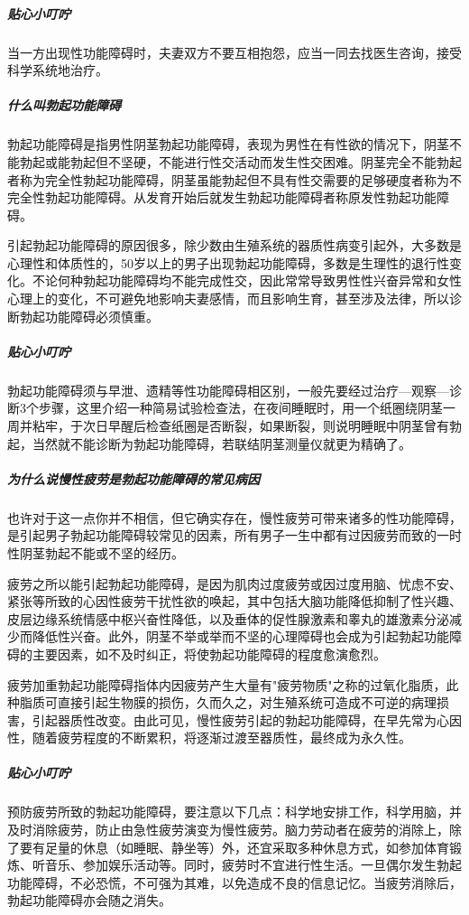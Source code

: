 \subparagraph{贴心小叮咛}

当一方出现性功能障碍时，夫妻双方不要互相抱怨，应当一同去找医生咨询，接受科学系统地治疗。

\subparagraph{什么叫勃起功能障碍}

勃起功能障碍是指男性阴茎勃起功能障碍，表现为男性在有性欲的情况下，阴茎不能勃起或能勃起但不坚硬，不能进行性交活动而发生性交困难。阴茎完全不能勃起者称为完全性勃起功能障碍，阴茎虽能勃起但不具有性交需要的足够硬度者称为不完全性勃起功能障碍。从发育开始后就发生勃起功能障碍者称原发性勃起功能障碍。

引起勃起功能障碍的原因很多，除少数由生殖系统的器质性病变引起外，大多数是心理性和体质性的，50岁以上的男子出现勃起功能障碍，多数是生理性的退行性变化。不论何种勃起功能障碍均不能完成性交，因此常常导致男性性兴奋异常和女性心理上的变化，不可避免地影响夫妻感情，而且影响生育，甚至涉及法律，所以诊断勃起功能障碍必须慎重。

\subparagraph{贴心小叮咛}

勃起功能障碍须与早泄、遗精等性功能障碍相区别，一般先要经过治疗—观察—诊断3个步骤，这里介绍一种简易试验检查法，在夜间睡眠时，用一个纸圈绕阴茎一周并粘牢，于次日早醒后检查纸圈是否断裂，如果断裂，则说明睡眠中阴茎曾有勃起，当然就不能诊断为勃起功能障碍，若联结阴茎测量仪就更为精确了。

\subparagraph{为什么说慢性疲劳是勃起功能障碍的常见病因}

也许对于这一点你并不相信，但它确实存在，慢性疲劳可带来诸多的性功能障碍，是引起男子勃起功能障碍较常见的因素，所有男子一生中都有过因疲劳而致的一时性阴茎勃起不能或不坚的经历。

疲劳之所以能引起勃起功能障碍，是因为肌肉过度疲劳或因过度用脑、忧虑不安、紧张等所致的心因性疲劳干扰性欲的唤起，其中包括大脑功能降低抑制了性兴趣、皮层边缘系统情感中枢兴奋性降低，以及垂体的促性腺激素和睾丸的雄激素分泌减少而降低性兴奋。此外，阴茎不举或举而不坚的心理障碍也会成为引起勃起功能障碍的主要因素，如不及时纠正，将使勃起功能障碍的程度愈演愈烈。

疲劳加重勃起功能障碍指体内因疲劳产生大量有"疲劳物质"之称的过氧化脂质，此种脂质可直接引起生物膜的损伤，久而久之，对生殖系统可造成不可逆的病理损害，引起器质性改变。由此可见，慢性疲劳引起的勃起功能障碍，在早先常为心因性，随着疲劳程度的不断累积，将逐渐过渡至器质性，最终成为永久性。

\subparagraph{贴心小叮咛}

预防疲劳所致的勃起功能障碍，要注意以下几点：科学地安排工作，科学用脑，并及时消除疲劳，防止由急性疲劳演变为慢性疲劳。脑力劳动者在疲劳的消除上，除了要有足量的休息（如睡眠、静坐等）外，还宜采取多种休息方式，如参加体育锻炼、听音乐、参加娱乐活动等。同时，疲劳时不宜进行性生活。一旦偶尔发生勃起功能障碍，不必恐慌，不可强为其难，以免造成不良的信息记忆。当疲劳消除后，勃起功能障碍亦会随之消失。

